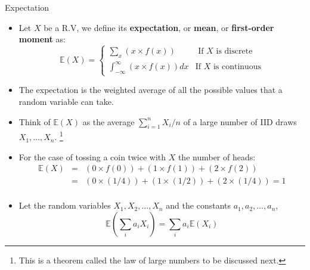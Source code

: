 \documentclass[handout]{beamer}
\begin{document}
\begin{frame}{Expectation}
\scriptsize{
\begin{itemize}
 \item Let $X$ be a R.V, we define its \textbf{expectation}, or \textbf{mean}, or \textbf{first-order moment} as:
  \begin{displaymath}
  \mathbb{E}(X) = \left\{ \begin{array}{rl}
  \sum_{x}(x\times f(x)) &\mbox{ If $X$ is discrete} \\
   \int_{-\infty}^{\infty}(x\times f(x))dx &\mbox{If $X$ is continuous}
       \end{array} \right.
  \end{displaymath}
\item The expectation is the weighted average of all the possible values that a random variable can take.
\item Think of $\mathbb{E}(X)$ as the average $\sum_{i=1}^{n}X_i/n$ of a large number of IID draws $X_1, \dots,X_n$. \footnote{This is  a theorem called the law of large numbers to be discussed next.}
\item For the case of tossing a coin twice with $X$ the number of heads:
 \begin{eqnarray*}
  \mathbb{E}(X) & = & (0 \times f(0)) + (1 \times f(1)) + (2 \times f(2)) \nonumber \\
       & = & (0 \times (1/4)) + (1 \times (1/2)) + (2 \times (1/4)) =1  \nonumber \\
 \end{eqnarray*}


\item Let the random variables $X_1, X_2, \dots , X_n$ and the constants $a_1, a_2, \dots, a_n$,
\begin{displaymath}
 \mathbb{E}\left(\sum_{i}a_i X_i \right) = \sum_{i} a_{i} \mathbb{E}(X_i)
\end{displaymath}
 


\end{itemize}
}

\end{frame}
\end{document}
